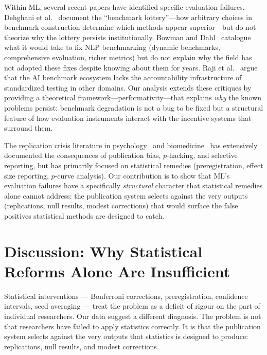 \documentclass{article}
\begin{document}
Within ML, several recent papers have identified specific evaluation failures. Dehghani et al.~\citep{dehghani_benchmark_2021} document the ``benchmark lottery''---how arbitrary choices in benchmark construction determine which methods appear superior---but do not theorize why the lottery persists institutionally. Bowman and Dahl~\citep{bowman_what_2021} catalogue what it would take to fix NLP benchmarking (dynamic benchmarks, comprehensive evaluation, richer metrics) but do not explain why the field has not adopted these fixes despite knowing about them for years. Raji et al.~\citep{raji_ai_2021} argue that the AI benchmark ecosystem lacks the accountability infrastructure of standardized testing in other domains. Our analysis extends these critiques by providing a theoretical framework---performativity---that explains \textit{why} the known problems persist: benchmark degradation is not a bug to be fixed but a structural feature of how evaluation instruments interact with the incentive systems that surround them.

The replication crisis literature in psychology~\citep{nosek_replication_2015} and biomedicine~\citep{ioannidis_2005} has extensively documented the consequences of publication bias, $p$-hacking, and selective reporting, but has primarily focused on statistical remedies (preregistration, effect size reporting, $p$-curve analysis). Our contribution is to show that ML's evaluation failures have a specifically \textit{structural} character that statistical remedies alone cannot address: the publication system selects against the very outputs (replications, null results, modest corrections) that would surface the false positives statistical methods are designed to catch.


\section{Discussion: Why Statistical Reforms Alone Are Insufficient}
\label{sec:discussion}

Statistical interventions --- Bonferroni corrections, preregistration, confidence intervals, seed averaging --- treat the problem as a deficit of rigour on the part of individual researchers. Our data suggest a different diagnosis. The problem is not that researchers have failed to apply statistics correctly. It is that the publication system selects against the very outputs that statistics is designed to produce: replications, null results, and modest corrections.
\end{document}
